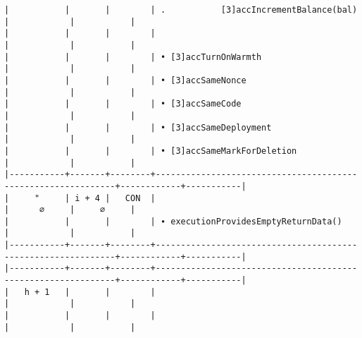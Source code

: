 \documentclass[varwidth=\maxdimen,margin=0.5cm,multi={verbatim}]{standalone}
\begin{document}
\begin{verbatim}
|           |       |        | .           [3]accIncrementBalance(bal)                      |            |           |
|           |       |        |                                                              |            |           |
|           |       |        | • [3]accTurnOnWarmth                                         |            |           |
|           |       |        | • [3]accSameNonce                                            |            |           |
|           |       |        | • [3]accSameCode                                             |            |           |
|           |       |        | • [3]accSameDeployment                                       |            |           |
|           |       |        | • [3]accSameMarkForDeletion                                  |            |           |
|-----------+-------+--------+--------------------------------------------------------------+------------+-----------|
|     "     | i + 4 |   CON  |                                                              |      ∅     |     ∅     |
|           |       |        | ∙ executionProvidesEmptyReturnData()                         |            |           |
|-----------+-------+--------+--------------------------------------------------------------+------------+-----------|
|-----------+-------+--------+--------------------------------------------------------------+------------+-----------|
|   h + 1   |       |        |                                                              |            |           |
|           |       |        |                                                              |            |           |
\end{verbatim}
\end{document}
